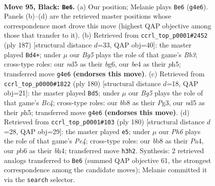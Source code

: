 \documentclass[11pt]{article}
\begin{document}
\clearpage

\begin{figure}[p]\centering
\begin{subfigure}{0.46\textwidth}\centering
\resizebox{\linewidth}{!}{%
\newchessgame
\chessboard[
  setfen={1B3k2/8/1P6/3N4/P3B1bR/1K5p/8/6r1 b - - 12 95},
  showmover=false,
  pgfstyle=straightmove, color=movearrow, markmove={g4-e6}
]}
\caption{}
\end{subfigure}\hfill
\begin{subfigure}{0.46\textwidth}\centering
\resizebox{\linewidth}{!}{%
\newchessgame
\chessboard[
  setfen={6k1/pR6/1b3KB1/7P/8/8/8/4r3 b - - 67 94},
  showmover=false,
  pgfstyle=straightmove, color=movearrow, markmove={b6-d4}
]}
\caption{}
\end{subfigure}
\\[4pt]
\begin{subfigure}{0.46\textwidth}\centering
\resizebox{\linewidth}{!}{%
\newchessgame
\chessboard[
  setfen={4b3/8/4Pk2/5p1p/1rB5/4K1P1/8/2R5 w - - 10 91},
  showmover=false,
  pgfstyle=straightmove, color=movearrow, markmove={c4-d5}
]}
\caption{}
\end{subfigure}\hfill
\begin{subfigure}{0.46\textwidth}\centering
\resizebox{\linewidth}{!}{%
\newchessgame
\chessboard[
  setfen={8/8/1k3p2/8/P2RP2b/4r3/4B3/5K2 w - - 6 91},
  showmover=false,
  pgfstyle=straightmove, color=movearrow, markmove={e4-e5}
]}
\caption{}
\end{subfigure}
\caption{\textbf{Move 95, Black: \texttt{Be6}.} (a) Our position; Melanie plays \texttt{Be6} (\texttt{g4e6}). Panels (b)--(d) are the retrieved master positions whose correspondence most drove this move (highest QAP objective among those that transfer to it). (b) Retrieved from \texttt{ccrl\_top\_p0001\#2452} (ply 187) [structural distance $d$=33, QAP obj=40]: the master played \texttt{Bd4+}; under $\mu$ our \emph{Bg5} plays the role of that game's \emph{Bb3}; cross-type roles: our \emph{n}d5 as their \emph{b}g6, our \emph{b}e4 as their \emph{p}h5; transferred move \texttt{g4e6} \textbf{(endorses this move)}. (c) Retrieved from \texttt{ccrl\_top\_p0000\#1822} (ply 180) [structural distance $d$=18, QAP obj=21]: the master played \texttt{Bd5}; under $\mu$ our \emph{Bg5} plays the role of that game's \emph{Bc4}; cross-type roles: our \emph{b}b8 as their \emph{P}g3, our \emph{n}d5 as their \emph{p}h5; transferred move \texttt{g4e6} \textbf{(endorses this move)}. (d) Retrieved from \texttt{ccrl\_top\_p0001\#103} (ply 180) [structural distance $d$=28, QAP obj=29]: the master played \texttt{e5}; under $\mu$ our \emph{Ph6} plays the role of that game's \emph{Pe4}; cross-type roles: our \emph{b}b8 as their \emph{P}a4, our \emph{p}b6 as their \emph{b}h4; transferred move \texttt{h3h2}. Synthesis: 2 retrieved analogs transferred to \texttt{Be6} (summed QAP objective 61, the strongest correspondence among the candidate moves); Melanie committed it via the \texttt{search} selector.}
\label{fig:thought-m189}
\end{figure}
\end{document}
